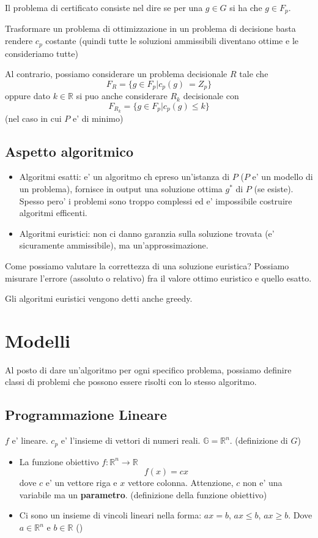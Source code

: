 \documentclass{report}
\begin{document}
Il problema di certificato consiste nel dire se per una $ g \in G $ si ha che $ g \in F_p $.

Trasformare un problema di ottimizzazione in un problema di decisione basta rendere $ c_p $ costante (quindi tutte le soluzioni ammissibili diventano ottime e le consideriamo tutte)

Al contrario, possiamo considerare un problema decisionale $ R $ tale che 
\[
  F_R = \{g \in F_p | c_p(g)\ = Z_p\}
\]
oppure dato $ k \in \mathbb{R} $ si puo anche considerare $ R_k $ decisionale con 
\[
  F_{R_k} = \{ g \in F_p | c_p(g) \leq k\}
\]
(nel caso in cui $ P $ e' di minimo)

\subsection{Aspetto algoritmico}
\begin{itemize}
  \item Algoritmi esatti: e' un algoritmo ch epreso un'istanza di $ P $ ($ P $ e' un modello di un problema), fornisce in output una soluzione ottima $ g^* $ di $ P $ (se esiste). Spesso pero' i problemi sono troppo complessi ed e' impossibile costruire algoritmi efficenti.
  \item Algoritmi euristici: non ci danno garanzia sulla soluzione trovata (e' sicuramente ammissibile), ma un'approssimazione.
\end{itemize}

Come possiamo valutare la correttezza di una soluzione euristica? Possiamo misurare l'errore (assoluto o relativo) fra il valore ottimo euristico e quello esatto.

Gli algoritmi euristici vengono detti anche greedy.

\section{Modelli}
Al posto di dare un'algoritmo per ogni specifico problema, possiamo definire classi di problemi che possono essere risolti con lo stesso algoritmo.

\subsection{Programmazione Lineare}

$ f $ e' lineare. 
$ c_p $ e' l'insieme di vettori di numeri reali. $ \mathbb{G} = \mathbb{R}^n $. (definizione di $ G $)

\begin{itemize}
\item La funzione obiettivo $ f: \mathbb{R}^n \to \mathbb{R} $
  \[
    f(x) = cx
  \]
    dove $ c $ e' un vettore riga e $ x $ vettore colonna. Attenzione, $ c $ non e' una variabile ma un \textbf{parametro}. (definizione della funzione obiettivo)
  \item Ci sono un insieme di vincoli lineari nella forma: $ ax = b $, $ ax \leq b $, $ ax \geq b $. Dove $ a \in \mathbb{R}^n $ e $ b \in \mathbb{R} $ ()
\end{itemize}
\end{document}
